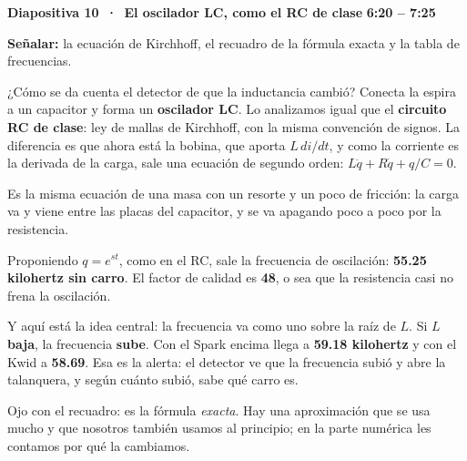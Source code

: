 \documentclass[11pt,a4paper]{article}
\newcommand{\diapo}[3]{%
  \par\vspace{8pt}
  {\large\bfseries Diapositiva #1 \,·\, #2}\hfill{\normalsize\bfseries\color{AzulIcesi} #3}\par
  \vspace{1pt}}
\newcommand{\senala}[1]{{\small\color{AzulIcesi}\textbf{Señalar:} #1}\par}
\begin{document}
\diapo{10}{El oscilador LC, como el RC de clase}{6:20 -- 7:25}
\senala{la ecuación de Kirchhoff, el recuadro de la fórmula exacta y la tabla de frecuencias.}

¿Cómo se da cuenta el detector de que la inductancia cambió? Conecta la espira a un capacitor y forma un
\textbf{oscilador LC}. Lo analizamos igual que el \textbf{circuito RC de clase}: ley de mallas de Kirchhoff, con
la misma convención de signos. La diferencia es que ahora está la bobina, que aporta $L\,di/dt$, y como la
corriente es la derivada de la carga, sale una ecuación de segundo orden: $L\ddot q + R\dot q + q/C = 0$.

\begin{opcional}
Es la misma ecuación de una masa con un resorte y un poco de fricción: la carga va y viene entre las placas del
capacitor, y se va apagando poco a poco por la resistencia.
\end{opcional}

Proponiendo $q = e^{st}$, como en el RC, sale la frecuencia de oscilación: \textbf{55.25 kilohertz sin carro}. El
factor de calidad es \textbf{48}, o sea que la resistencia casi no frena la oscilación.

Y aquí está la idea central: la frecuencia va como uno sobre la raíz de $L$. Si $L$ \textbf{baja}, la frecuencia
\textbf{sube}. Con el Spark encima llega a \textbf{59.18 kilohertz} y con el Kwid a \textbf{58.69}. Esa es la
alerta: el detector ve que la frecuencia subió y abre la talanquera, y según cuánto subió, sabe qué carro es.

\begin{opcional}
Ojo con el recuadro: es la fórmula \emph{exacta}. Hay una aproximación que se usa mucho y que nosotros también
usamos al principio; en la parte numérica les contamos por qué la cambiamos.
\end{opcional}
\end{document}
